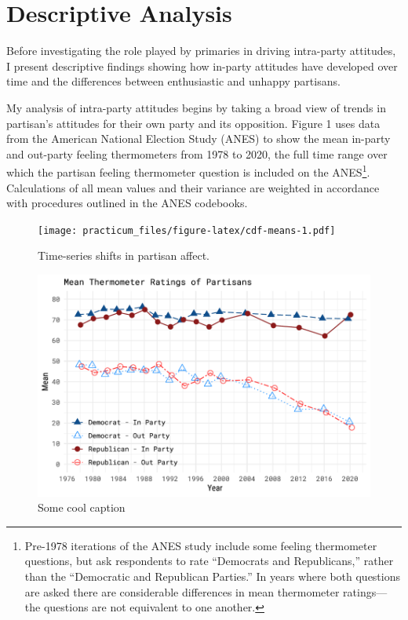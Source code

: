 \documentclass[
]{article}
\begin{document}
\hypertarget{descriptive-analysis}{%
\section{Descriptive Analysis}\label{descriptive-analysis}}

Before investigating the role played by primaries in driving intra-party attitudes, I present descriptive findings showing how in-party attitudes have developed over time and the differences between enthusiastic and unhappy partisans.

My analysis of intra-party attitudes begins by taking a broad view of trends in partisan's attitudes for their own party and its opposition. Figure 1 uses data from the American National Election Study (ANES) to show the mean in-party and out-party feeling thermometers from 1978 to 2020, the full time range over which the partisan feeling thermometer question is included on the ANES\footnote{Pre-1978 iterations of the ANES study include some feeling thermometer questions, but ask respondents to rate ``Democrats and Republicans,'' rather than the ``Democratic and Republican Parties.'' In years where both questions are asked there are considerable differences in mean thermometer ratings---the questions are not equivalent to one another.}. Calculations of all mean values and their variance are weighted in accordance with procedures outlined in the ANES codebooks.

\begin{figure}
\centering
\texttt{[image: practicum\_files/figure-latex/cdf-means-1.pdf]}
\caption{\label{fig:cdf-means}Time-series shifts in partisan affect.}
\end{figure}

\begin{figure}[H]

{\centering \includegraphics[width=0.75\linewidth]{gg-cdf-means} 

}

\caption{Some cool caption}\label{fig:image-ref-for-in-text}
\end{figure}
\end{document}
